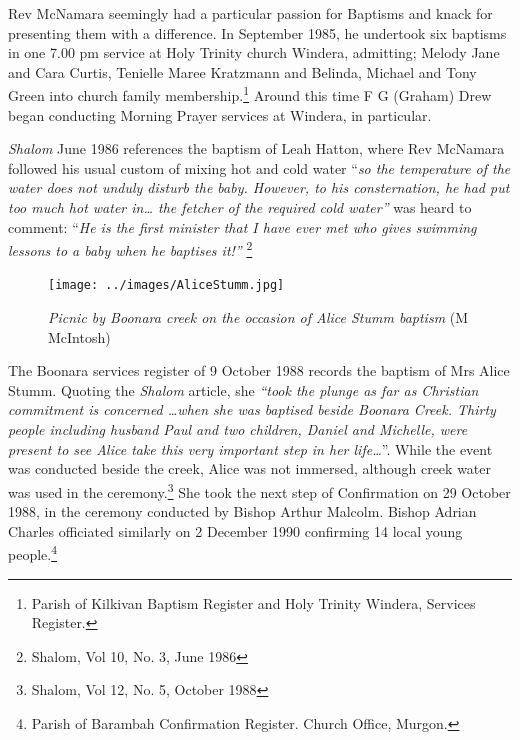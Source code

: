 Rev McNamara seemingly had a particular passion for Baptisms and knack for presenting them with a difference. In September 1985, he undertook six baptisms in one 7.00 pm service at Holy Trinity church Windera, admitting; Melody Jane and Cara Curtis, Tenielle Maree Kratzmann and Belinda, Michael and Tony Green into church family membership.\footnote{Parish of Kilkivan Baptism Register and Holy Trinity Windera, Services Register.} Around this time F G (Graham) Drew began conducting Morning Prayer services at Windera, in particular.


\emph{Shalom} June 1986 references the baptism of Leah Hatton, where Rev McNamara followed his usual custom of mixing hot and cold water ``\emph{so the temperature of the water does not unduly disturb the baby. However, to his consternation, he had put too much hot water in\ldots{} the fetcher of the required cold water''} was heard to comment: ``\emph{He is the first minister that I have ever met who gives swimming lessons to a baby when he baptises it!''} \footnote{Shalom, Vol 10, No. 3, June 1986}








\begin{figure}
\begin{center}
\texttt{[image: ../images/AliceStumm.jpg]}
\caption{{\itshape Picnic by Boonara creek on the occasion of Alice Stumm baptism} {\scriptsize(M McIntosh)}}
\end{center}
\end{figure}




The Boonara services register of 9 October 1988 records the baptism of Mrs Alice Stumm. Quoting the \emph{Shalom} article, she \emph{``took the plunge as far as Christian commitment is concerned \ldots when she was baptised beside Boonara Creek. Thirty people including husband Paul and two children, Daniel and Michelle, were present to see Alice take this very important step in her life\ldots{}}''. While the event was conducted beside the creek, Alice was not immersed, although creek water was used in the ceremony.\footnote{Shalom, Vol 12, No. 5, October 1988} She took the next step of Confirmation on 29 October 1988, in the ceremony conducted by Bishop Arthur Malcolm. Bishop Adrian Charles officiated similarly on 2 December 1990 confirming 14 local young people.\footnote{Parish of Barambah Confirmation Register. Church Office, Murgon.}


